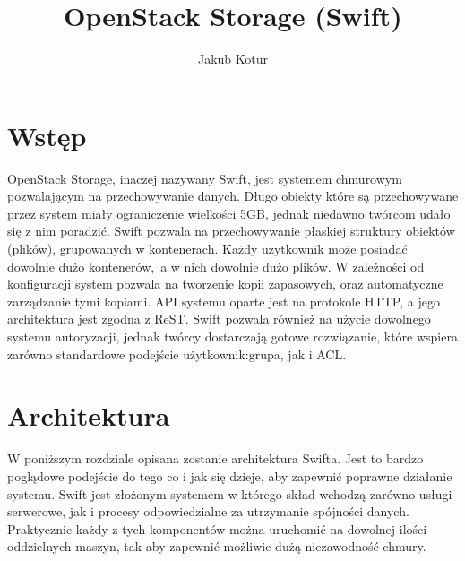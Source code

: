 


\title{OpenStack Storage (Swift)}
\author{Jakub Kotur}



\maketitle

\section{Wstęp}

\nocite{openstack}

OpenStack Storage, inaczej nazywany Swift, jest systemem chmurowym pozwalającym na przechowywanie danych. Długo obiekty które są przechowywane przez system miały ograniczenie wielkości 5GB, jednak niedawno twórcom udało się z nim poradzić. Swift pozwala na przechowywanie płaskiej struktury obiektów (plików), grupowanych w kontenerach. Każdy użytkownik może posiadać dowolnie dużo kontenerów,~a w nich dowolnie dużo plików. W zależności od konfiguracji system pozwala na tworzenie kopii zapasowych, oraz automatyczne zarządzanie tymi kopiami. API systemu oparte jest na protokole HTTP, a jego architektura jest zgodna z ReST. Swift pozwala również na użycie dowolnego systemu autoryzacji, jednak twórcy dostarczają gotowe rozwiązanie, które wspiera zarówno standardowe podejście użytkownik:grupa, jak i ACL.



\section{Architektura}\label{sec:architektura}

W poniższym rozdziale opisana zostanie architektura Swifta. Jest to bardzo poglądowe podejście do tego co i jak się dzieje, aby zapewnić poprawne działanie systemu. Swift jest złożonym systemem w którego skład wchodzą zarówno usługi serwerowe, jak i procesy odpowiedzialne za utrzymanie spójności danych. Praktycznie każdy z tych komponentów można uruchomić na dowolnej ilości oddzielnych maszyn, tak aby zapewnić możliwie dużą niezawodność chmury.

